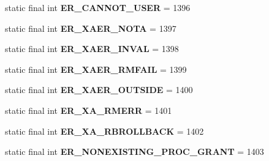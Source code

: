\begin{DoxyCompactItemize}
static final int {\bfseries E\+R\+\_\+\+C\+A\+N\+N\+O\+T\+\_\+\+U\+S\+ER} = 1396
\item 
\mbox{\label{classcom_1_1mysql_1_1jdbc_1_1_mysql_error_numbers_a4db26ce243329eac7dc59772262c0e7a}} 
static final int {\bfseries E\+R\+\_\+\+X\+A\+E\+R\+\_\+\+N\+O\+TA} = 1397
\item 
\mbox{\label{classcom_1_1mysql_1_1jdbc_1_1_mysql_error_numbers_aa03f57afcfdb9885a21a164b8f66b28e}} 
static final int {\bfseries E\+R\+\_\+\+X\+A\+E\+R\+\_\+\+I\+N\+V\+AL} = 1398
\item 
\mbox{\label{classcom_1_1mysql_1_1jdbc_1_1_mysql_error_numbers_a814dd7dbc057e66d26cd9ac5c091e67f}} 
static final int {\bfseries E\+R\+\_\+\+X\+A\+E\+R\+\_\+\+R\+M\+F\+A\+IL} = 1399
\item 
\mbox{\label{classcom_1_1mysql_1_1jdbc_1_1_mysql_error_numbers_a713e5f47b0e0473091b55c2fd48e958b}} 
static final int {\bfseries E\+R\+\_\+\+X\+A\+E\+R\+\_\+\+O\+U\+T\+S\+I\+DE} = 1400
\item 
\mbox{\label{classcom_1_1mysql_1_1jdbc_1_1_mysql_error_numbers_a6d025b7f2ee21a79dce6f00e90d65d65}} 
static final int {\bfseries E\+R\+\_\+\+X\+A\+\_\+\+R\+M\+E\+RR} = 1401
\item 
\mbox{\label{classcom_1_1mysql_1_1jdbc_1_1_mysql_error_numbers_abf7fc79757cb8dbdb41104c2ecfa738e}} 
static final int {\bfseries E\+R\+\_\+\+X\+A\+\_\+\+R\+B\+R\+O\+L\+L\+B\+A\+CK} = 1402
\item 
\mbox{\label{classcom_1_1mysql_1_1jdbc_1_1_mysql_error_numbers_a0f53224e500b0e0110927b667d330e3f}} 
static final int {\bfseries E\+R\+\_\+\+N\+O\+N\+E\+X\+I\+S\+T\+I\+N\+G\+\_\+\+P\+R\+O\+C\+\_\+\+G\+R\+A\+NT} = 1403
\item 
\mbox{\label{classcom_1_1mysql_1_1jdbc_1_1_mysql_error_numbers_a600ef620f51df5748211c6069ce5b7b7}} 

\end{DoxyCompactItemize}
